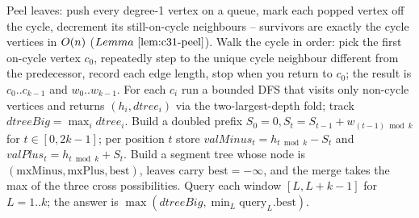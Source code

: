 Peel leaves: push every degree-1 vertex on a queue, mark each popped vertex off
the cycle, decrement its still-on-cycle neighbours -- survivors are exactly the
cycle vertices in \(O(n)\) (\(\lemref{c31-peel}\)).  Walk the cycle in order: pick
the first on-cycle vertex \(c_0\), repeatedly step to the unique cycle neighbour
different from the predecessor, record each edge length, stop when you return to
\(c_0\); the result is \(c_0..c_{k-1}\) and \(w_0..w_{k-1}\).  For each \(c_i\) run a
bounded DFS that visits only non-cycle vertices and returns
\((h_i,\mathit{dtree}_i)\) via the two-largest-depth fold; track
\(\mathit{dtreeBig}=\max_i\mathit{dtree}_i\).  Build a doubled prefix
\(S_0{=}0, S_t{=}S_{t-1}{+}w_{(t-1)\bmod k}\) for \(t\in[0,2k{-}1]\); per position
\(t\) store \(\mathit{valMinus}_t{=}h_{t\bmod k}{-}S_t\) and
\(\mathit{valPlus}_t{=}h_{t\bmod k}{+}S_t\).  Build a segment tree whose node is
\((\mathrm{mxMinus},\mathrm{mxPlus},\mathrm{best})\), leaves carry \(\mathrm{best}{=}-\infty\),
and the merge takes the max of the three cross possibilities.  Query each window
\([L,L{+}k{-}1]\) for \(L{=}1..k\); the answer is
\(\max(\mathit{dtreeBig},\min_L\mathrm{query}_L.\mathrm{best})\).

